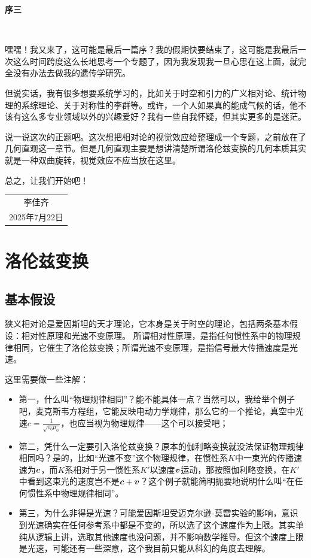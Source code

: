 \documentclass[12pt, a4paper, oneside]{ctexbook}
\begin{document}
\newpage
\begin{center}
	\Huge\textbf{序三}
\end{center}~\

嘿嘿！我又来了，这可能是最后一篇序？我的假期快要结束了，这可能是我最后一次这么时间跨度这么长地思考一个专题了，因为我发现我一旦心思在这上面，就完全没有办法去做我的遗传学研究。
\par   但说实话，我有很多想要系统学习的，比如关于时空和引力的广义相对论、统计物理的系综理论、关于对称性的李群等。或许，一个人如果真的能成气候的话，他不该有这么多专业领域以外的兴趣爱好？我有一些自我怀疑，但其实更多的是迷茫。
\par   说一说这次的正题吧。这次想把相对论的视觉效应给整理成一个专题，之前放在了几何直观这一章节。但是几何直观主要是想讲清楚所谓洛伦兹变换的几何本质其实就是一种双曲旋转，视觉效应不应当放在这里。
\par   总之，让我们开始吧！
~\\
\begin{flushright}
	\begin{tabular}{c}
		李佳齐\\
		2025年7月22日
	\end{tabular}
\end{flushright}

\newpage
{}
\setcounter{page}{1}
\tableofcontents
\newpage
\setcounter{page}{1}


\chapter{洛伦兹变换}

\section{基本假设}

狭义相对论是爱因斯坦的天才理论，它本身是关于时空的理论，包括两条基本假设：相对性原理和光速不变原理。
所谓相对性原理，是指任何惯性系中的物理规律相同，它催生了洛伦兹变换；所谓光速不变原理，是指信号最大传播速度是光速。\par 
这里需要做一些注解：
\begin{itemize}
	\item 第一，什么叫“物理规律相同”？能不能具体一点？当然可以，我给举个例子吧，麦克斯韦方程组，它能反映电动力学规律，那么它的一个推论，真空中光速$c=\frac{1}{\sqrt{\varepsilon_{0}\mu_{0}}}$，也应当视为物理规律——这个可以接受吧；
	\item 第二，凭什么一定要引入洛伦兹变换？原本的伽利略变换就没法保证物理规律相同吗？是的，比如“光速不变”这个物理规律，在惯性系$K$中一束光的传播速速为$\vb*{c}$，而$K$系相对于另一惯性系$K'$以速度$\vb*{v}$运动，那按照伽利略变换，在$K'$中看到这束光的速度岂不是$\vb*{c}+\vb*{v}$？这个例子就能简明扼要地说明什么叫“在任何惯性系中物理规律相同”。
	\item 第三，为什么非得是光速？可能爱因斯坦受迈克尔逊-莫雷实验的影响，意识到光速确实在任何参考系中都是不变的，所以选了这个速度作为上限。其实单纯从逻辑上讲，选取其他速度也没问题，并不影响数学推导。但这个速度上限是光速，可能还有一些深意，这个我目前只能从科幻的角度去理解。
\end{itemize}
\end{document}
